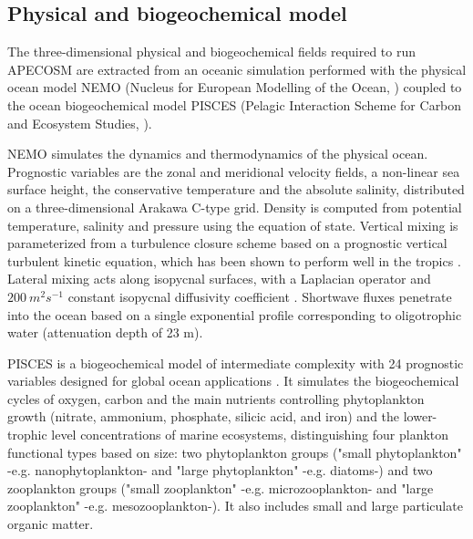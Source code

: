 
\subsection{Physical and biogeochemical model}
\label{sec:nemo}

The three-dimensional physical and biogeochemical fields required to run APECOSM are extracted from an oceanic simulation performed with the physical ocean model NEMO (Nucleus for European Modelling of the Ocean, \citealp{madecNEMOOceanEngine2019}) coupled to the ocean biogeochemical model PISCES (Pelagic Interaction Scheme for Carbon and Ecosystem Studies, \citealp{aumontPISCESv2OceanBiogeochemical2015}). 

NEMO simulates the dynamics and thermodynamics of the physical ocean. Prognostic variables are
the zonal and meridional velocity fields, a non-linear sea surface height, the
conservative temperature and the absolute salinity, distributed on a three-dimensional Arakawa C-type grid. Density is computed from potential temperature, salinity and pressure using the \cite{iocInternationalThermodynamicEquation2010} equation of state. Vertical mixing is parameterized from a turbulence closure scheme based on a prognostic vertical turbulent kinetic equation, which has been shown to perform well in the tropics \citep{blankeVariabilityTropicalAtlantic1993}. Lateral mixing acts along isopycnal surfaces, with a Laplacian operator and $200\ m^2 s^{-1}$ constant isopycnal diffusivity coefficient \citep{lengaigneImpactIsopycnalMixing2003}. Shortwave fluxes penetrate into the ocean based on a single exponential profile \citep{paulsonIrradianceMeasurementsUpper1977} corresponding to oligotrophic water (attenuation depth of 23 m). 

PISCES is a biogeochemical model of intermediate complexity with 24 prognostic variables designed for global ocean applications \citep{aumontPISCESv2OceanBiogeochemical2015}. It simulates the biogeochemical cycles of oxygen, carbon and the main nutrients controlling phytoplankton growth (nitrate, ammonium, phosphate, silicic acid, and iron) and the lower-trophic level concentrations of marine ecosystems, distinguishing four plankton functional types based on size: two phytoplankton groups ("small phytoplankton" -e.g. nanophytoplankton- and "large phytoplankton" -e.g. diatoms-) and two zooplankton groups ("small zooplankton" -e.g. microzooplankton- and "large zooplankton" -e.g. mesozooplankton-). It also includes small and large particulate organic matter.


